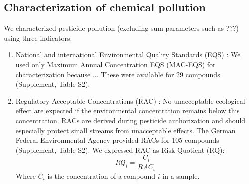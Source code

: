 \documentclass[journal=esthag,manuscript=article]{achemso}
\begin{document}
\subsection{Characterization of chemical pollution}
We characterized pesticide pollution (excluding sum parameters such as ???) using three indicators:

\begin{enumerate}
  \item National and international Environmental Quality Standards (EQS) \citep{ogewv_verordnung_2011,european_union_directive_2013}:
  We used only Maximum Annual Concentration EQS (MAC-EQS) for characterization because ...
  These were available for 29 compounds (Supplement, Table S2).
%
%
%
%

  \item Regulatory Acceptable Concentrations (RAC) \citep{brock_linking_2010}:
  No unacceptable ecological effect are expected if the environmental concentration remains below this concentration. 
  RACs are derived during pesticide authorization and should especially protect small streams from unacceptable effects.
  The German Federal Environmental Agency provided RACs for 105 compounds (Supplement, Table S2).  
  We expressed RAC as Risk Quotient (RQ):
  \begin{equation}
  RQ_i = \frac{C_i}{RAC_i}
  \end{equation}
  Where $C_i$ is the concentration of a compound $i$ in a sample.


\end{enumerate}
\end{document}
